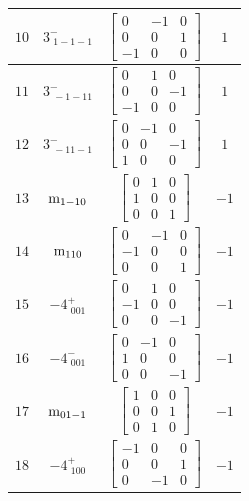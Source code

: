 \documentclass[fleqn,8pt]{jsarticle}
\begin{document}
\begin{longtable}{cccc}
$ 10 $ & $ 3^{-}_{\,\,1-1-1} $ & $ \begin{bmatrix} 0 & -1 & 0 \\ 0 & 0 & 1 \\ -1 & 0 & 0 \end{bmatrix} $ & $ 1 $ \\ \hline
$ 11 $ & $ 3^{-}_{\,\,-1-11} $ & $ \begin{bmatrix} 0 & 1 & 0 \\ 0 & 0 & -1 \\ -1 & 0 & 0 \end{bmatrix} $ & $ 1 $ \\ \hline
$ 12 $ & $ 3^{-}_{\,\,-11-1} $ & $ \begin{bmatrix} 0 & -1 & 0 \\ 0 & 0 & -1 \\ 1 & 0 & 0 \end{bmatrix} $ & $ 1 $ \\ \hline
$ 13 $ & $ {\rm m}_{1-10} $ & $ \begin{bmatrix} 0 & 1 & 0 \\ 1 & 0 & 0 \\ 0 & 0 & 1 \end{bmatrix} $ & $ -1 $ \\ \hline
$ 14 $ & $ {\rm m}_{110} $ & $ \begin{bmatrix} 0 & -1 & 0 \\ -1 & 0 & 0 \\ 0 & 0 & 1 \end{bmatrix} $ & $ -1 $ \\ \hline
$ 15 $ & $ -4^{+}_{\,\,001} $ & $ \begin{bmatrix} 0 & 1 & 0 \\ -1 & 0 & 0 \\ 0 & 0 & -1 \end{bmatrix} $ & $ -1 $ \\ \hline
$ 16 $ & $ -4^{-}_{\,\,001} $ & $ \begin{bmatrix} 0 & -1 & 0 \\ 1 & 0 & 0 \\ 0 & 0 & -1 \end{bmatrix} $ & $ -1 $ \\ \hline
$ 17 $ & $ {\rm m}_{01-1} $ & $ \begin{bmatrix} 1 & 0 & 0 \\ 0 & 0 & 1 \\ 0 & 1 & 0 \end{bmatrix} $ & $ -1 $ \\ \hline
$ 18 $ & $ -4^{+}_{\,\,100} $ & $ \begin{bmatrix} -1 & 0 & 0 \\ 0 & 0 & 1 \\ 0 & -1 & 0 \end{bmatrix} $ & $ -1 $ \\ \hline

\end{longtable}
\end{document}
